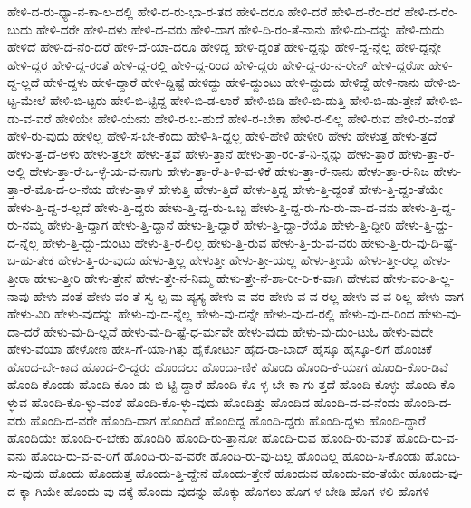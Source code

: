 {ಹೇಳಿ-ದ-ರು-ಧ್ಯಾ-ನ-ಕಾ-ಲ-ದಲ್ಲಿ
ಹೇಳಿ-ದ-ರು-ಭಾ-ರ-ತದ
ಹೇಳಿ-ದರೂ
ಹೇಳಿ-ದರೆ
ಹೇಳಿ-ದ-ರೆಂ-ದರೆ
ಹೇಳಿ-ದ-ರೆಂ-ಬುದು
ಹೇಳಿ-ದರೇ
ಹೇಳಿ-ದಳು
ಹೇಳಿ-ದ-ವರು
ಹೇಳಿ-ದಾಗ
ಹೇಳಿ-ದಿ-ರಂ-ತೆ-ನಾನು
ಹೇಳಿ-ದು-ದನ್ನು
ಹೇಳಿ-ದುದು
ಹೇಳಿದೆ
ಹೇಳಿ-ದೆ-ನೆಂ-ದರೆ
ಹೇಳಿ-ದೆ-ಯಾ-ದರೂ
ಹೇಳಿದ್ದ
ಹೇಳಿ-ದ್ದಂತೆ
ಹೇಳಿ-ದ್ದನ್ನು
ಹೇಳಿ-ದ್ದ-ನ್ನೆಲ್ಲ
ಹೇಳಿ-ದ್ದನ್ನೇ
ಹೇಳಿ-ದ್ದರ
ಹೇಳಿ-ದ್ದ-ರಂತೆ
ಹೇಳಿ-ದ್ದ-ರಲ್ಲಿ
ಹೇಳಿ-ದ್ದ-ರಿಂದ
ಹೇಳಿ-ದ್ದರು
ಹೇಳಿ-ದ್ದ-ರು-ನ-ರೇನ್
ಹೇಳಿ-ದ್ದರೋ
ಹೇಳಿ-ದ್ದ-ಲ್ಲದೆ
ಹೇಳಿ-ದ್ದಳು
ಹೇಳಿ-ದ್ದಾರೆ
ಹೇಳಿ-ದ್ದಿಷ್ಟೆ
ಹೇಳಿದ್ದು
ಹೇಳಿ-ದ್ದುಂಟು
ಹೇಳಿ-ದ್ದುದು
ಹೇಳಿದ್ದೆ
ಹೇಳಿ-ನಾನು
ಹೇಳಿ-ಬಿ-ಟ್ಟ-ಮೇಲೆ
ಹೇಳಿ-ಬಿ-ಟ್ಟರು
ಹೇಳಿ-ಬಿ-ಟ್ಟಿದ್ದ
ಹೇಳಿ-ಬಿ-ಡ-ಲಾರೆ
ಹೇಳಿ-ಬಿಡಿ
ಹೇಳಿ-ಬಿ-ಡುತ್ತಿ
ಹೇಳಿ-ಬಿ-ಡು-ತ್ತೇನೆ
ಹೇಳಿ-ಬಿ-ಡು-ವ-ವರೆ
ಹೇಳಿಯೇ
ಹೇಳಿ-ಯೇನು
ಹೇಳಿ-ರ-ಬ-ಹುದೆ
ಹೇಳಿ-ರ-ಬೇಕಾ
ಹೇಳಿ-ರ-ಲಿಲ್ಲ
ಹೇಳಿ-ರುವ
ಹೇಳಿ-ರು-ವಂತೆ
ಹೇಳಿ-ರು-ವುದು
ಹೇಳಿಲ್ಲ
ಹೇಳಿ-ಸ-ಬೇ-ಕೆಂದು
ಹೇಳಿ-ಸಿ-ದ್ದಲ್ಲ
ಹೇಳಿ-ಹೇಳಿ
ಹೇಳೀರಿ
ಹೇಳು
ಹೇಳುತ್ತ
ಹೇಳು-ತ್ತದೆ
ಹೇಳು-ತ್ತ-ದೆ-ಅಳು
ಹೇಳು-ತ್ತಲೇ
ಹೇಳು-ತ್ತವೆ
ಹೇಳು-ತ್ತಾನೆ
ಹೇಳು-ತ್ತಾ-ರಂ-ತೆ-ನಿ-ನ್ನನ್ನು
ಹೇಳು-ತ್ತಾರೆ
ಹೇಳು-ತ್ತಾ-ರೆ-ಅಲ್ಲಿ
ಹೇಳು-ತ್ತಾ-ರೆ-ಒ-ಳ್ಳೆ-ಯ-ವ-ನಾಗು
ಹೇಳು-ತ್ತಾ-ರೆ-ತಿ-ಳಿ-ವ-ಳಿಕೆ
ಹೇಳು-ತ್ತಾ-ರೆ-ನಾನು
ಹೇಳು-ತ್ತಾ-ರೆ-ನಿಜ
ಹೇಳು-ತ್ತಾ-ರೆ-ಮೊ-ದ-ಲ-ನೆಯ
ಹೇಳು-ತ್ತಾಳೆ
ಹೇಳುತ್ತಿ
ಹೇಳು-ತ್ತಿದೆ
ಹೇಳು-ತ್ತಿದ್ದ
ಹೇಳು-ತ್ತಿ-ದ್ದಂತೆ
ಹೇಳು-ತ್ತಿ-ದ್ದಂ-ತೆಯೇ
ಹೇಳು-ತ್ತಿ-ದ್ದ-ರ-ಲ್ಲದೆ
ಹೇಳು-ತ್ತಿ-ದ್ದರು
ಹೇಳು-ತ್ತಿ-ದ್ದ-ರು-ಒಬ್ಬ
ಹೇಳು-ತ್ತಿ-ದ್ದ-ರು-ಗು-ರು-ವಾ-ದ-ವನು
ಹೇಳು-ತ್ತಿ-ದ್ದ-ರು-ನಮ್ಮ
ಹೇಳು-ತ್ತಿ-ದ್ದಾಗ
ಹೇಳು-ತ್ತಿ-ದ್ದಾನೆ
ಹೇಳು-ತ್ತಿ-ದ್ದಾರೆ
ಹೇಳು-ತ್ತಿ-ದ್ದಾ-ರೆಯೊ
ಹೇಳು-ತ್ತಿ-ದ್ದೀರಿ
ಹೇಳು-ತ್ತಿ-ದ್ದು-ದ-ನ್ನೆಲ್ಲ
ಹೇಳು-ತ್ತಿ-ದ್ದು-ದುಂಟು
ಹೇಳು-ತ್ತಿ-ರ-ಲಿಲ್ಲ
ಹೇಳು-ತ್ತಿ-ರುವ
ಹೇಳು-ತ್ತಿ-ರು-ವ-ವರು
ಹೇಳು-ತ್ತಿ-ರು-ವು-ದಿ-ಷ್ಟೆ-ಬ-ಹು-ತೇಕ
ಹೇಳು-ತ್ತಿ-ರು-ವುದು
ಹೇಳು-ತ್ತಿಲ್ಲ
ಹೇಳುತ್ತೀ
ಹೇಳು-ತ್ತೀ-ಯಲ್ಲ
ಹೇಳು-ತ್ತೀಯೆ
ಹೇಳು-ತ್ತೀ-ರಲ್ಲ
ಹೇಳು-ತ್ತೀರಾ
ಹೇಳು-ತ್ತೀರಿ
ಹೇಳು-ತ್ತೇನೆ
ಹೇಳು-ತ್ತೇ-ನೆ-ನಿಮ್ಮ
ಹೇಳು-ತ್ತೇ-ನೆ-ಶಾ-ರೀ-ರಿ-ಕ-ವಾಗಿ
ಹೇಳುವ
ಹೇಳು-ವಂ-ತಿ-ಲ್ಲ-ನಾವು
ಹೇಳು-ವಂತೆ
ಹೇಳು-ವಂ-ತೆ-ಸ್ವ-ಲ್ಪ-ಮ-ಪ್ಯಸ್ಯ
ಹೇಳು-ವ-ವರ
ಹೇಳು-ವ-ವ-ರಲ್ಲ
ಹೇಳು-ವ-ವ-ರಿಲ್ಲ
ಹೇಳು-ವಾಗ
ಹೇಳು-ವಿರಿ
ಹೇಳು-ವುದನ್ನು
ಹೇಳು-ವು-ದ-ನ್ನೆಲ್ಲ
ಹೇಳು-ವು-ದನ್ನೇ
ಹೇಳು-ವು-ದ-ರಲ್ಲಿ
ಹೇಳು-ವು-ದ-ರಿಂದ
ಹೇಳು-ವು-ದಾ-ದರೆ
ಹೇಳು-ವು-ದಿ-ಲ್ಲವೆ
ಹೇಳು-ವು-ದಿ-ಷ್ಟೆ-ಧ-ರ್ಮವೇ
ಹೇಳು-ವುದು
ಹೇಳು-ವು-ದುಂ-ಟುಓ
ಹೇಳು-ವುದೇ
ಹೇಳು-ವೆಯಾ
ಹೇಳೋಣ
ಹೇಸಿ-ಗೆ-ಯಾ-ಗಿತ್ತು
ಹೈಕೋರ್ಟು
ಹೈದ-ರಾ-ಬಾದ್
ಹೈಸ್ಕೂ
ಹೈಸ್ಕೂ-ಲಿಗೆ
ಹೊಂಚಿಕೆ
ಹೊಂದ-ಬೇ-ಕಾದ
ಹೊಂದ-ಲಿ-ದ್ದರು
ಹೊಂದಲು
ಹೊಂದಾ-ಣಿಕೆ
ಹೊಂದಿ
ಹೊಂದಿ-ಕೆ-ಯಾಗ
ಹೊಂದಿ-ಕೊಂ-ಡಿವೆ
ಹೊಂದಿ-ಕೊಂಡು
ಹೊಂದಿ-ಕೊಂ-ಡು-ಬಿ-ಟ್ಟಿ-ದ್ದಾರೆ
ಹೊಂದಿ-ಕೊ-ಳ್ಳ-ಬೇ-ಕಾ-ಗು-ತ್ತದೆ
ಹೊಂದಿ-ಕೊಳ್ಳು
ಹೊಂದಿ-ಕೊ-ಳ್ಳುವ
ಹೊಂದಿ-ಕೊ-ಳ್ಳು-ವಂತೆ
ಹೊಂದಿ-ಕೊ-ಳ್ಳು-ವುದು
ಹೊಂದಿತ್ತು
ಹೊಂದಿದ
ಹೊಂದಿ-ದ-ವ-ನೆಂದು
ಹೊಂದಿ-ದ-ವರು
ಹೊಂದಿ-ದ-ವರೇ
ಹೊಂದಿ-ದಾಗ
ಹೊಂದಿದೆ
ಹೊಂದಿದ್ದ
ಹೊಂದಿ-ದ್ದರು
ಹೊಂದಿ-ದ್ದಳು
ಹೊಂದಿ-ದ್ದಾರೆ
ಹೊಂದಿಯೇ
ಹೊಂದಿ-ರ-ಬೇಕು
ಹೊಂದಿರಿ
ಹೊಂದಿ-ರು-ತ್ತಾನೋ
ಹೊಂದಿ-ರುವ
ಹೊಂದಿ-ರು-ವಂತೆ
ಹೊಂದಿ-ರು-ವ-ವನು
ಹೊಂದಿ-ರು-ವ-ವ-ರಿಗೆ
ಹೊಂದಿ-ರು-ವ-ವರೇ
ಹೊಂದಿ-ರು-ವು-ದಿಲ್ಲ
ಹೊಂದಿಲ್ಲ
ಹೊಂದಿ-ಸಿ-ಕೊಂಡು
ಹೊಂದಿ-ಸು-ವುದು
ಹೊಂದು
ಹೊಂದುತ್ತ
ಹೊಂದು-ತ್ತಿ-ದ್ದೇನೆ
ಹೊಂದು-ತ್ತೇನೆ
ಹೊಂದುವ
ಹೊಂದು-ವಂ-ತೆಯೇ
ಹೊಂದು-ವು-ದ-ಕ್ಕಾ-ಗಿಯೇ
ಹೊಂದು-ವು-ದಕ್ಕೆ
ಹೊಂದು-ವುದನ್ನು
ಹೊಕ್ಕು
ಹೊಗಲು
ಹೊಗ-ಳ-ಬೇಡಿ
ಹೊಗ-ಳಲಿ
ಹೊಗಳಿ
}
